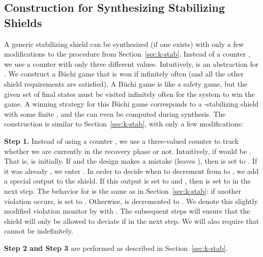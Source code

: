 \documentclass{llncs}
\newcommand{\buchi}{B\"uchi\xspace}
\begin{document}
\subsection{Construction for Synthesizing Stabilizing Shields} 
\label{sec:stab-app}

A generic stabilizing shield can be synthesized (if one exists) with 
only a few modifications to the procedure from Section~\ref{sec:k-stab}. 
Instead of a counter , we use a counter 
 with only three different values.  Intuitively,  is 
an abstraction for .  
We construct a \buchi game that is won if  infinitely often 
(and all the other shield requirements are satisfied).  A \buchi game is 
like a safety game, but the given set of final states must be visited 
infinitely often for the system to win the game.  A winning strategy for 
this \buchi game corresponds to a -stabilizing shield with some 
finite , and the  can even be computed during synthesis.  The 
construction is similar to Section~\ref{sec:k-stab}, with only a few 
modifications:

\noindent
\textbf{Step 1.} Instead of using a counter , we 
use a three-valued counter  to track whether we are 
currently in the recovery phase or not. Intuitively,  if  would 
be . That is,  is  initially.  If  and the design 
makes a mistake (leaves ), then  is set to .  If it was 
already , we enter .  In order to decide when to decrement  
from  to , we add a special output  to the shield.  If this 
output is set to  and , then  is set to  in the next 
step. The behavior for  is the same as in Section~\ref{sec:k-stab}: 
if another violation occurs,  is set to . Otherwise,  is 
decremented to .  We denote this slightly modified violation monitor 
by  
with . The subsequent steps will 
ensure that the shield will only be allowed to deviate if  in the 
next step.  We will also require that  cannot be  indefinitely.

\noindent
\textbf{Step 2 and Step 3} are performed as described in 
Section~\ref{sec:k-stab}.
\end{document}
